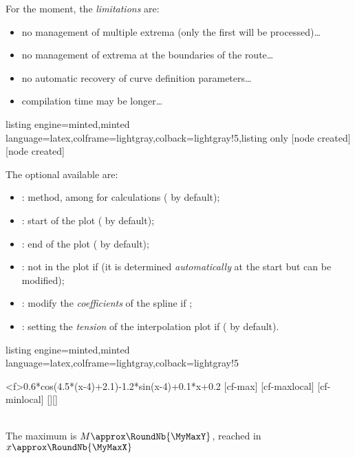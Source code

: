 \documentclass[11pt,a4paper]{ltxdoc}
\begin{document}
{\small\faBomb} For the moment, the \textit{limitations} are:

\begin{itemize}
	\item no management of multiple extrema (only the first will be processed)\ldots
	\item no management of extrema at the boundaries of the route\ldots
	\item no automatic recovery of curve definition parameters\ldots
	\item compilation time may be longer\ldots
\end{itemize}

\begin{tcblisting}{listing engine=minted,minted language=latex,colframe=lightgray,colback=lightgray!5,listing only}
[node created]
[node created]
\end{tcblisting}

The optional \MontreCode{[keys]} available are:

\smallskip

\begin{itemize}
	\item {}: method, among  for calculations ( by default);
	\item {}: start of the plot ( by default);
	\item {}: end of the plot ( by default);
	\item {}: not in the plot if  (it is determined \textit{automatically} at the start but can be modified);
	\item {}: modify the \textit{coefficients} of the spline if ;
	\item {}: setting the \textit{tension} of the interpolation plot if ( by default).
\end{itemize}

\begin{tcblisting}{listing engine=minted,minted language=latex,colframe=lightgray,colback=lightgray!5}
\begin{GraphTikz}[x=1cm,y=1cm,Xmin=-1,Xmax=5,Ymin=-1,Ymax=3]
	\DefineCurve[Name=cf,Start=0.35,End=4.2,Trace]%
		<f>{0.6*cos(4.5*(x-4)+2.1)-1.2*sin(x-4)+0.1*x+0.2}
	[cf-max]
	[cf-maxlocal]
	[cf-minlocal]
	[\MyMaxX][\MyMaxY]
\end{GraphTikz}\\
The maximum is $M\approx\RoundNb{\MyMaxY}$, reached in $x\approx\RoundNb{\MyMaxX}$
\end{tcblisting}
\end{document}
